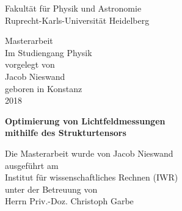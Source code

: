 
\thispagestyle{empty}
\begin{center}
  \renewcommand{\baselinestretch}{2.00}
  \Large\sffamily
  Fakult\"{a}t f\"{u}r Physik und Astronomie\\
  \large
  Ruprecht-Karls-Universit\"{a}t Heidelberg
  \par\vfill\normalfont
  Masterarbeit\\
  Im Studiengang Physik\\
  vorgelegt von\\
  Jacob Nieswand\\
  geboren in Konstanz\\
  2018\\
\end{center}
\newpage

\thispagestyle{empty}
\begin{center}
  \renewcommand{\baselinestretch}{2.00}
  \Large\bfseries\sffamily
    Optimierung von Lichtfeldmessungen\\
    mithilfe des Strukturtensors\\
    
  \par
  \vfill
  \large\normalfont
  Die Masterarbeit wurde von Jacob Nieswand\\
  ausgef\"{u}hrt am\\
  Institut für wissenschaftliches Rechnen (IWR)\\
  unter der Betreuung von\\
  Herrn Priv.-Doz. Christoph Garbe
\end{center}\par
\vspace{5\baselineskip}

\renewcommand{\baselinestretch}{1.00}\normalsize